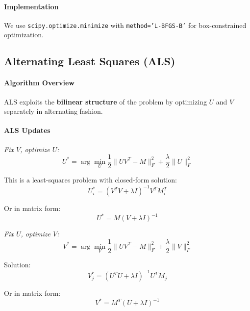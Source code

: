 \documentclass[11pt,oneside]{article}
\newcommand{\defn}[1]{\textbf{#1}}
\begin{document}
\paragraph{Implementation}

We use \texttt{scipy.optimize.minimize} with \texttt{method='L-BFGS-B'} for box-constrained optimization.

\subsection{Alternating Least Squares (ALS)}\label{subsec:als}

\paragraph{Algorithm Overview}

ALS exploits the \defn{bilinear structure} of the problem by optimizing $U$ and $V$ separately in alternating fashion.

\paragraph{ALS Updates}

\textit{Fix $V$, optimize $U$:}
\begin{equation}
    U^* = \arg\min_U \frac{1}{2}\|UV^T - M\|_F^2 + \frac{\lambda}{2}\|U\|_F^2
\end{equation}

This is a least-squares problem with closed-form solution:
\begin{equation}
    U_i^* = (V^TV + \lambda I)^{-1} V^T M_i^T
\end{equation}

Or in matrix form:
\begin{equation}
    U^* = M(V + \lambda I)^{-1}
\end{equation}

\textit{Fix $U$, optimize $V$:}
\begin{equation}
    V^* = \arg\min_V \frac{1}{2}\|UV^T - M\|_F^2 + \frac{\lambda}{2}\|V\|_F^2
\end{equation}

Solution:
\begin{equation}
    V_j^* = (U^TU + \lambda I)^{-1} U^T M_j
\end{equation}

Or in matrix form:
\begin{equation}
    V^* = M^T(U + \lambda I)^{-1}
\end{equation}
\end{document}
